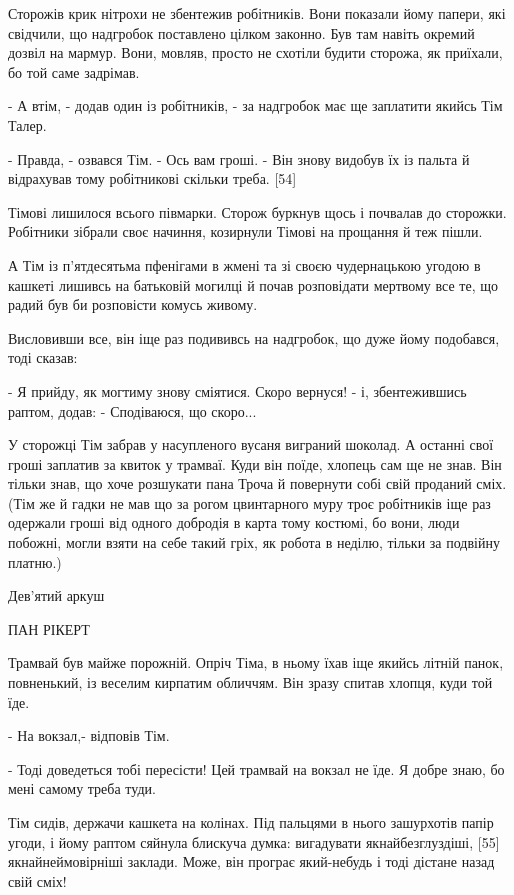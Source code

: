 Сторожів крик нітрохи не збентежив робітників. Вони показали йому папери, які свідчили, що надгробок поставлено цілком законно. Був там навіть окремий дозвіл на мармур. Вони, мовляв, просто не схотіли будити сторожа, як приїхали, бо той саме задрімав.

- А втім, - додав один із робітників, - за надгробок має ще заплатити якийсь Тім Талер.

- Правда, - озвався Тім. - Ось вам гроші. - Він знову видобув їх із пальта й відрахував тому робітникові скільки треба. [54]

Тімові лишилося всього півмарки. Сторож буркнув щось і почвалав до сторожки. Робітники зібрали своє начиння, козирнули Тімові на прощання й теж пішли.

А Тім із п'ятдесятьма пфенігами в жмені та зі своєю чудернацькою угодою в кашкеті лишивсь на батьковій могилці й почав розповідати мертвому все те, що радий був би розповісти комусь живому.

Висловивши все, він іще раз подививсь на надгробок, що дуже йому подобався, тоді сказав:

- Я прийду, як могтиму знову сміятися. Скоро вернуся! - і, збентежившись раптом, додав: - Сподіваюся, що скоро...

У сторожці Тім забрав у насупленого вусаня виграний шоколад. А останні свої гроші заплатив за квиток у трамваї. Куди він поїде, хлопець сам ще не знав. Він тільки знав, що хоче розшукати пана Троча й повернути собі свій проданий сміх. (Тім же й гадки не мав що за рогом цвинтарного муру троє робітників іще раз одержали гроші від одного добродія в карта тому костюмі, бо вони, люди побожні, могли взяти на себе такий гріх, як робота в неділю, тільки за подвійну платню.)

Дев'ятий аркуш

ПАН РІКЕРТ

Трамвай був майже порожній. Опріч Тіма, в ньому їхав іще якийсь літній панок, повненький, із веселим кирпатим обличчям. Він зразу спитав хлопця, куди той їде.

- На вокзал,- відповів Тім.

- Тоді доведеться тобі пересісти! Цей трамвай на вокзал не їде. Я добре знаю, бо мені самому треба туди.

Тім сидів, держачи кашкета на колінах. Під пальцями в нього зашурхотів папір угоди, і йому раптом сяйнула блискуча думка: вигадувати якнайбезглуздіші, [55] якнайнеймовірніші заклади. Може, він програє який-небудь і тоді дістане назад свій сміх!

